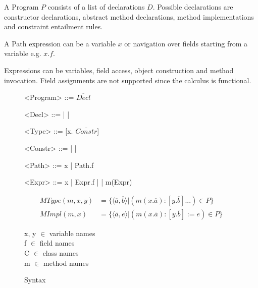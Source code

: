 A Program $P$ consists of a list of declarations $D$.
Possible declarations are constructor declarations,
abstract method declarations, method implementations and constraint entailment rules.

A Path expression can be a variable $x$ or navigation over fields starting from a variable e.g. $x.f$.

Expressions can be variables, field access, object construction and method invocation.
Field assignments are not supported since the calculus is functional.

\begin{figure}
\setlength{\grammarindent}{5em} %
\begin{grammar}
<Program>  ::= $\overline{Decl}$

<Decl> ::=  %
       | 
       \alt {} %
       |  %

<Type> ::= [x. $\overline{Constr}$]

<Constr> ::=  %
           |  %
           |  %

<Path> ::= x
       | Path.f

<Expr> ::= x
       | Expr.f
       |  %
       | m(Expr)
\end{grammar}

\begin{align*}
MType(m, x, y) &= \{ \langle\overline{a}, \overline{b}\rangle | (m(x. \overline{a}): [y. \overline{b}]...) \in P \} \\
MImpl(m, x) &= \{\langle\overline{a}, e\rangle | (m(x. \overline{a}): [y. \overline{b}] := e) \in P \}
\end{align*}

x, y $\in$ variable names\\
f $\in$ field names\\
C $\in$ class names\\
m $\in$ method names
\caption{Syntax}
\end{figure}

